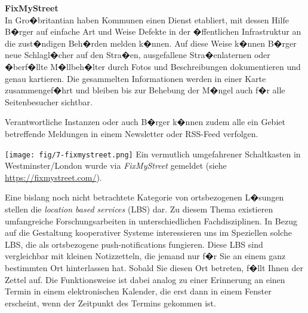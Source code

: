 \begin{example}%
\textbf{FixMyStreet}\\
In Gro�britantian haben Kommunen einen Dienst etabliert, mit dessen Hilfe B�rger auf einfache Art und Weise Defekte in der �ffentlichen Infrastruktur an die zust�ndigen Beh�rden melden k�nnen. Auf diese Weise k�nnen B�rger neue Schlagl�cher auf den Stra�en, ausgefallene Stra�enlaternen oder �berf�llte M�llbeh�lter durch Fotos und Beschreibungen dokumentieren und genau kartieren. Die gesammelten Informationen werden in einer Karte zusammengef�hrt und bleiben bis zur Behebung der M�ngel auch f�r alle Seitenbesucher sichtbar.

Verantwortliche Instanzen oder auch B�rger k�nnen zudem alle ein Gebiet betreffende Meldungen in einem Newsletter oder RSS-Feed verfolgen.

\begin{center}
 \texttt{[image: fig/7-fixmystreet.png]}
  {Ein vermutlich umgefahrener Schaltkasten in Westminster/London wurde via \textit{FixMyStreet} gemeldet (siehe \url{https://fixmystreet.com/}).}
  \label{fixmystreet}
\end{center}

\end{example}
\newpage
Eine bislang noch nicht betrachtete Kategorie von ortsbezogenen L�sungen stellen die \textit{location based services} (LBS) dar. Zu diesem Thema existieren umfangreiche Forschungsarbeiten in unterschiedlichen Fachdisziplinen. In Bezug auf die Gestaltung kooperativer Systeme interessieren uns im Speziellen solche LBS, die als ortsbezogene push-notifications fungieren. Diese LBS sind vergleichbar mit kleinen Notizzetteln, die jemand nur f�r Sie an einem ganz bestimmten Ort hinterlassen hat. Sobald Sie diesen Ort betreten, f�llt Ihnen der Zettel auf. Die Funktionsweise ist dabei analog zu einer Erinnerung an einen Termin in einem elektronischen Kalender, die erst dann in einem Fenster erscheint, wenn der Zeitpunkt des Termins gekommen ist. 


